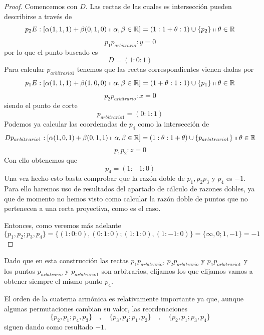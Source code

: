 \begin{proof}
	Comencemos con $D$. Las rectas de las cuales es intersección pueden describirse a través de 
	\begin{equation*}
		p_2E:\left [ \alpha(1,1,1)+\beta(0,1,0)\shortparallel\alpha,\beta\in \mathbb{R} \right ]=(1:1+\theta:1)\cup\{p_2\}\shortparallel\theta\in\mathbb{R}
	\end{equation*}
	\begin{equation*}
		p_1p_{arbitrario}:y=0
	\end{equation*}
	por lo que el punto buscado es
	\[D=(1:0:1)\]
	Para calcular $p_{arbitrario1}$ tenemos que las rectas correspondientes vienen dadas por
	\begin{equation*}
		p_1E:\left [ \alpha(1,1,1)+\beta(1,0,0)\shortparallel\alpha,\beta\in \mathbb{R} \right ]=(1+\theta:1:1)\cup\{p_1\}\shortparallel\theta\in\mathbb{R}
	\end{equation*}
	\begin{equation*}
		p_2p_{arbitrario}:x=0
	\end{equation*}
	siendo el punto de corte
	\[p_{arbitrario1}=(0:1:1)\]
	Podemos ya calcular las coordenadas de $p_4$ como la intersección de 
	\begin{equation*}
		Dp_{arbitrario1}:\left [ \alpha(1,0,1)+\beta(0,1,1)\shortparallel\alpha,\beta\in \mathbb{R} \right ]=(1:\theta:1+\theta)\cup\{p_{arbitrario1}\}\shortparallel\theta\in\mathbb{R}
	\end{equation*}
	\begin{equation*}
		p_1p_2:z=0
	\end{equation*}
	Con ello obtenemos que
	\[p_4=(1:-1:0)\]
	Una vez hecho esto basta comprobar que la razón doble de $p_1,p_2p_3$ y $p_4$ es $-1$. Para ello haremos uso de resultados del apartado de cálculo de razones dobles, ya que de momento no hemos visto como calcular la razón doble de puntos que no pertenecen a una recta proyectiva, como es el caso.
	
	Entonces, como veremos más adelante
	\begin{equation}
		\{p_1,p_2;p_3,p_4\}=\{(1:0:0),(0:1:0);(1:1:0),(1:-1:0)\}=\{\infty,0;1,-1\}=-1
	\end{equation}
\end{proof}
Dado que en esta construcción las rectas $p_1p_{arbitrario}$, $p_2p_{arbitrario}$ y $p_1p_{arbitrario1}$ y los puntos $p_{arbitrario}$ y $p_{arbitrario1}$ son arbitrarios, elijamos los que elijamos vamos a obtener siempre el mismo punto $p_4$. 

El orden de la cuaterna armónica es relativamente importante ya que, aunque algunas permutaciones cambian su valor, las reordenaciones
\begin{equation*}
	\{p_2,p_1;p_4,p_3\} \quad , \quad \{p_3,p_4;p_1,p_2\}\quad , \quad \{p_2,p_1;p_3,p_4\}
\end{equation*}
siguen dando como resultado $-1$.

